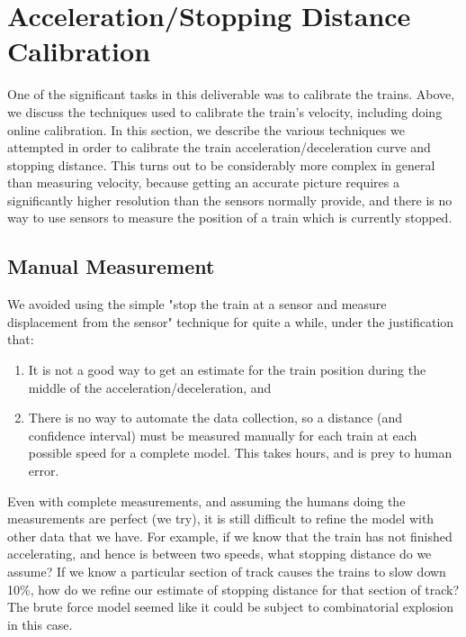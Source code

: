 \documentclass[titlepage]{article}
\begin{document}
\section{Acceleration/Stopping Distance Calibration}
One of the significant tasks in this deliverable was to calibrate the trains.
Above, we discuss the techniques used to calibrate the train's velocity,
including doing online calibration. In this section, we describe the various
techniques we attempted in order to calibrate the train
acceleration/deceleration curve and stopping distance. This turns out to be
considerably more complex in general than measuring velocity, because getting
an accurate picture requires a significantly higher resolution than the sensors
normally provide, and there is no way to use sensors to measure the position of
a train which is currently stopped.

\subsection{Manual Measurement}
We avoided using the simple "stop the train
at a sensor and measure displacement from the sensor" technique for quite a
while, under the justification that:
\begin{enumerate}
\item It is not a good way to get an estimate for the train position during
	the middle of the acceleration/deceleration, and
\item There is no way to automate the data collection, so a distance (and
confidence interval) must be measured manually for each train at each possible
speed for a complete model. This takes hours, and is prey to human error.
\end{enumerate}
Even with complete measurements, and assuming the humans doing the measurements
are perfect (we try), it is still difficult to refine the model with other
data that we have. For example, if we know that the train has not finished
accelerating, and hence is between two speeds, what stopping distance do we
assume? If we know a particular section of track causes the trains to slow
down 10\%, how do we refine our estimate of stopping distance for that section
of track? The brute force model seemed like it could be subject to
combinatorial explosion in this case.
\end{document}
